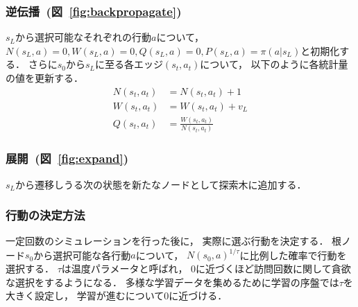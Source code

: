 \subsubsection*{逆伝播~(図~\ref{fig:backpropagate})}
$s_L$から選択可能なそれぞれの行動$a$について， $N(s_L, a)=0, W(s_L, a)=0, Q(s_L, a)=0, P(s_L, a)=\pi(a|s_L)$と初期化する．
さらに$s_0$から$s_L$に至る各エッジ$(s_t,a_t)$について， 以下のように各統計量の値を更新する．
\begin{align*}
  N(s_t, a_t) &= N(s_t, a_t)+1 \\
  W(s_t, a_t) &= W(s_t, a_t) + v_L \\
  Q(s_t, a_t) &= \frac{W(s_t,a_t)}{N(s_t,a_t)}
\end{align*}

\subsubsection*{展開~(図~\ref{fig:expand})}
$s_L$から遷移しうる次の状態を新たなノードとして探索木に追加する．

\subsubsection*{行動の決定方法}
一定回数のシミュレーションを行った後に， 実際に選ぶ行動を決定する．
根ノード$s_0$から選択可能な各行動$a$について， $N(s_0, a)^{1/\tau}$に比例した確率で行動を選択する．
$\tau$は温度パラメータと呼ばれ， $0$に近づくほど訪問回数に関して貪欲な選択をするようになる．
多様な学習データを集めるために学習の序盤では$\tau$を大きく設定し， 学習が進むについて$0$に近づける．

